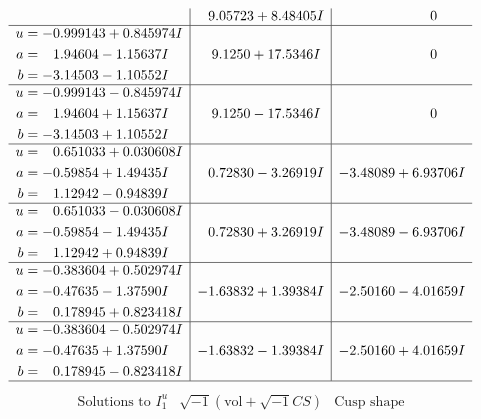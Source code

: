 \documentclass[1p]{elsarticle_modified}
\theoremstyle{definition}
\newcommand{\I}{\sqrt{-1}}
\begin{document}
$$\begin{array}{c|c|c}
 & \phantom{-}9.05723 + 8.48405 I & \phantom{-0.000000 } 0 \\ \hline\begin{aligned}
u &= -0.999143 + 0.845974 I \\
a &= \phantom{-}1.94604 - 1.15637 I \\
b &= -3.14503 - 1.10552 I\end{aligned}
 & \phantom{-}9.1250 + 17.5346 I & \phantom{-0.000000 } 0 \\ \hline\begin{aligned}
u &= -0.999143 - 0.845974 I \\
a &= \phantom{-}1.94604 + 1.15637 I \\
b &= -3.14503 + 1.10552 I\end{aligned}
 & \phantom{-}9.1250 - 17.5346 I & \phantom{-0.000000 } 0 \\ \hline\begin{aligned}
u &= \phantom{-}0.651033 + 0.030608 I \\
a &= -0.59854 + 1.49435 I \\
b &= \phantom{-}1.12942 - 0.94839 I\end{aligned}
 & \phantom{-}0.72830 - 3.26919 I & -3.48089 + 6.93706 I \\ \hline\begin{aligned}
u &= \phantom{-}0.651033 - 0.030608 I \\
a &= -0.59854 - 1.49435 I \\
b &= \phantom{-}1.12942 + 0.94839 I\end{aligned}
 & \phantom{-}0.72830 + 3.26919 I & -3.48089 - 6.93706 I \\ \hline\begin{aligned}
u &= -0.383604 + 0.502974 I \\
a &= -0.47635 - 1.37590 I \\
b &= \phantom{-}0.178945 + 0.823418 I\end{aligned}
 & -1.63832 + 1.39384 I & -2.50160 - 4.01659 I \\ \hline\begin{aligned}
u &= -0.383604 - 0.502974 I \\
a &= -0.47635 + 1.37590 I \\
b &= \phantom{-}0.178945 - 0.823418 I\end{aligned}
 & -1.63832 - 1.39384 I & -2.50160 + 4.01659 I\\
 \hline 
 \end{array}$$\newpage$$\begin{array}{c|c|c}  
\text{Solutions to }I^u_{1}& \I (\text{vol} + \sqrt{-1}CS) & \text{Cusp shape}\\

\end{array}$$
\end{document}
